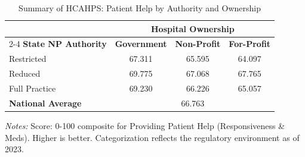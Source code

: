 \begin{table}[htbp]
    \centering
    \caption{Summary of HCAHPS: Patient Help by Authority and Ownership}
    \label{tab:hcahps_grp2_own}
    \vspace{0.2cm}
    \begin{tabular}{lccc}
        \toprule
        & \multicolumn{3}{c}{\textbf{Hospital Ownership}} \\
        \cmidrule(lr){2-4}
        \textbf{State NP Authority} & \textbf{Government} & \textbf{Non-Profit} & \textbf{For-Profit} \\
        \midrule
        Restricted & 67.311 & 65.595 & 64.097 \\
        Reduced & 69.775 & 67.068 & 67.765 \\
        Full Practice & 69.230 & 66.226 & 65.057 \\
        \midrule
        \textbf{National Average} & \multicolumn{3}{c}{66.763} \\
        \bottomrule
    \end{tabular}
    \vspace{0.1cm}
    \begin{minipage}{0.85\textwidth}
        \footnotesize \textit{Notes:} Score: 0-100 composite for Providing Patient Help (Responsiveness \& Meds). Higher is better. Categorization reflects the regulatory environment as of 2023.
    \end{minipage}
\end{table}